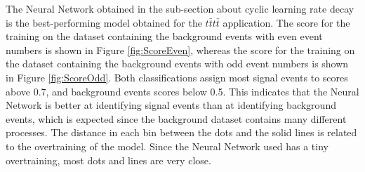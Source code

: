 The Neural Network obtained in the sub-section about cyclic learning rate decay is the best-performing model obtained for the $t\bar{t}t\bar{t}$ application. The score for the training on the dataset containing the background events with even event numbers is shown in Figure \ref{fig:ScoreEven}, whereas the score for the training on the dataset containing the background events with odd event numbers is shown in Figure \ref{fig:ScoreOdd}. Both classifications assign most signal events to scores above 0.7, and background events scores below 0.5. This indicates that the Neural Network is better at identifying signal events than at identifying background events, which is expected since the background dataset contains many different processes. The distance in each bin between the dots and the solid lines is related to the overtraining of the model. Since the Neural Network used has a tiny overtraining, most dots and lines are very close. \\

